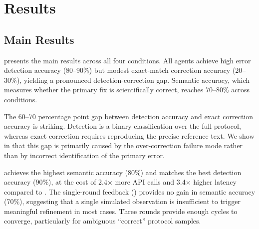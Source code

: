 \section{Results}
\label{sec:results}

\subsection{Main Results}
\label{sec:results:main}

 presents the main results across all four \wetlabagent conditions.
All agents achieve high error detection accuracy (80--90\%) but modest exact-match correction accuracy (20--30\%), yielding a pronounced detection-correction gap.
Semantic accuracy, which measures whether the primary fix is scientifically correct, reaches 70--80\% across conditions.

\begin{table}[t]
\centering
\caption{Main results on \bioprobench error correction ($n=10$). Detection Acc = error detection accuracy; Exact Acc = exact-match correction accuracy; Semantic Acc = semantic correction accuracy. Best results in \textbf{bold}. Latency is averaged per sample.}
\label{tab:main}
\end{table}

The 60--70 percentage point gap between detection accuracy and exact correction accuracy is striking.
Detection is a binary classification over the full protocol, whereas exact correction requires reproducing the precise reference text.
We show in  that this gap is primarily caused by the over-correction failure mode rather than by incorrect identification of the primary error.

\feedbackthree achieves the highest semantic accuracy (80\%) and matches the best detection accuracy (90\%), at the cost of 2.4$\times$ more API calls and 3.4$\times$ higher latency compared to \vanilla.
The single-round feedback (\feedbackone) provides no gain in semantic accuracy (70\%), suggesting that a single simulated observation is insufficient to trigger meaningful refinement in most cases.
Three rounds provide enough cycles to converge, particularly for ambiguous ``correct'' protocol samples.

